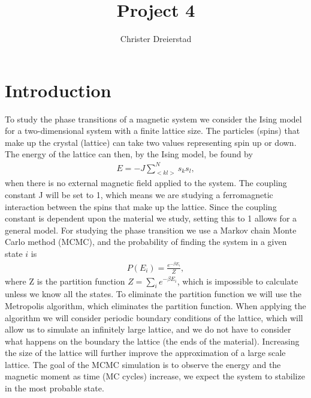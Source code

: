 \documentclass{emulateapj}
\begin{document}
\title{Project 4}

\author{Christer Dreierstad}





\begin{abstract}

\end{abstract}

\section{Introduction}
\label{sec:introduction}
To study the phase transitions of a magnetic system we consider the Ising model for a two-dimensional system with a finite lattice size. The particles (spins) that make up the crystal (lattice) can take two values representing spin up or down. The energy of the lattice can then, by the Ising model, be found by
%
\begin{gather}\label{eq:energyIsing}
    E = -J\sum_{< kl >}^N s_k s_l,
\end{gather}
%
when there is no external magnetic field applied to the system. The coupling constant J will be set to 1, which means we are studying a ferromagnetic interaction between the spins that make up the lattice. Since the coupling constant is dependent upon the material we study, setting this to 1 allows for a general model. For studying the phase transition we use a Markov chain Monte Carlo method (MCMC), and the probability of finding the system in a given state $i$ is
%
\begin{align*}
    P(E_i) = \frac{e^{-\beta E_i}}{Z},
\end{align*}
%
where Z is the partition function $Z = \sum_i e^{-\beta E_i}$, which is impossible to calculate unless we know all the states. To eliminate the partition function we will use the Metropolis algorithm, which eliminates the partition function. When applying the algorithm we will consider periodic boundary conditions of the lattice, which will allow us to simulate an infinitely large lattice, and we do not have to consider what happens on the boundary the lattice (the ends of the material). Increasing the size of the lattice will further improve the approximation of a large scale lattice. The goal of the MCMC simulation is to observe the energy and the magnetic moment as time (MC cycles) increase, we expect the system to stabilize in the most probable state.
\end{document}
